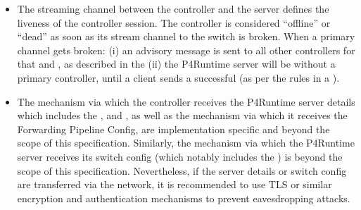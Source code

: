 \documentclass[11pt]{article}
\begin{document}
{\begin{itemize}
\item{}
The streaming channel between the controller and the server defines the
liveness of the controller session. The controller is considered \textquotedblleft{}offline\textquotedblright{} or
\textquotedblleft{}dead\textquotedblright{} as soon as its stream channel to the switch is broken. When a primary
channel gets broken: (i) an advisory message is sent to all other controllers
for that  and , as described in the
 (ii) the P4Runtime server
will be without a primary controller, until a client sends a successful
 (as per the rules in a
).%

\item{}
The mechanism via which the controller receives the P4Runtime server details
which includes the ,  and , as well as the mechanism via
which it receives the Forwarding Pipeline Config, are implementation specific
and beyond the scope of this specification. Similarly, the mechanism via which
the P4Runtime server receives its switch config (which notably includes the
) is beyond the scope of this specification.  Nevertheless, if the
server details or switch config are transferred via the network, it is
recommended to use TLS or similar encryption and authentication mechanisms to
prevent eavesdropping attacks.%
\end{itemize}%

}
\end{document}
